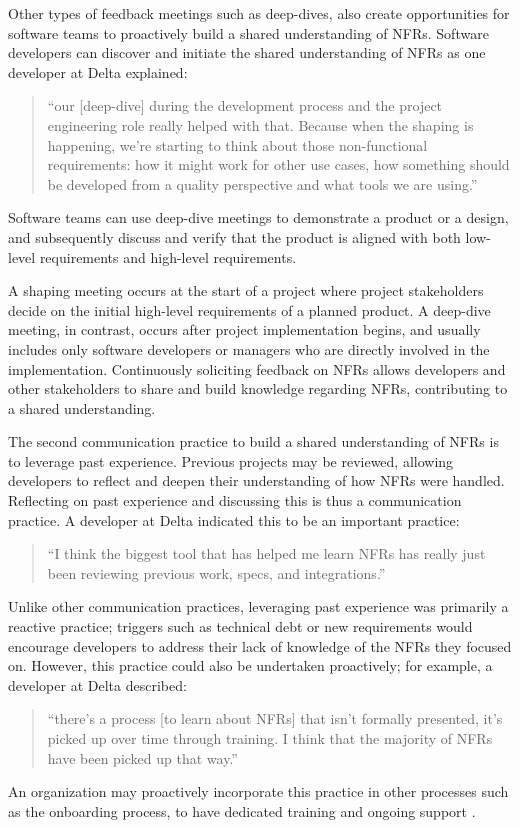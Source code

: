 \documentclass[smallextended]{svjour3}       %
\begin{document}
Other types of feedback meetings such as deep-dives, also create opportunities for software teams to proactively build a shared understanding of NFRs.
Software developers can discover and initiate the shared understanding of NFRs as one developer at Delta explained: 
\begin{quote}
    ``our [deep-dive] during the development process and the project engineering role really helped with that. Because when the shaping is happening, we're starting to think about those non-functional requirements: how it might work for other use cases, how something should be developed from a quality perspective and what tools we are using.''    
\end{quote}
Software teams can use deep-dive meetings to demonstrate a product or a design, and subsequently discuss and verify that the product is aligned with both low-level requirements and high-level requirements.

A shaping meeting occurs at the start of a project where project stakeholders decide on the initial high-level requirements of a planned product. A deep-dive meeting, in contrast, occurs after project implementation begins, and usually includes only software developers or managers who are directly involved in the implementation. 
Continuously soliciting feedback on NFRs allows developers and other stakeholders to share and build knowledge regarding NFRs, contributing to a shared understanding.



The second communication practice to build a shared understanding of NFRs is to leverage past experience. 
Previous projects may be reviewed, allowing developers to reflect and deepen their understanding of how NFRs were handled. Reflecting on past experience and discussing this is thus a communication practice.
A developer at Delta indicated this to be an important practice:
\begin{quote}
    ``I think the biggest tool that has helped me learn NFRs has really just been reviewing previous work, specs, and integrations.''
\end{quote}    

Unlike other communication practices, leveraging past experience was primarily a \textmd{reactive} practice; triggers such as technical debt or new requirements would encourage developers to address their lack of knowledge of the NFRs they focused on. However, this practice could also be undertaken proactively; for example, a developer at Delta described:
\begin{quote}
    ``there's a process [to learn about NFRs] that isn't formally presented, it's picked up over time through training. I think that the majority of NFRs have been picked up that way.'' 
\end{quote}    
An organization may proactively incorporate this practice in other processes such as the onboarding process, to have dedicated training and ongoing support \citep{sharma2020onboarding}.
\end{document}
